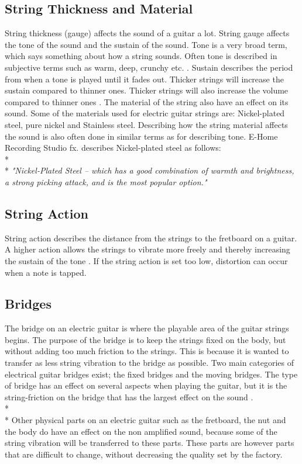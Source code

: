 \subsection{String Thickness and Material}
String thickness (gauge) affects the sound of a guitar a lot. String gauge affects the tone of the sound and the sustain of the sound. Tone is a very broad term, which says something about how a string sounds. Often tone is described in subjective terms such as warm, deep, crunchy etc. \cite{premierguitar}. Sustain describes the period from when a tone is played until it fades out. Thicker strings will increase the sustain compared to thinner ones. Thicker strings will also increase the volume compared to thinner ones \cite{Helsinki}.
The material of the string also have an effect on its sound. Some of the materials used for electric guitar strings are: Nickel-plated steel, pure nickel and Stainless steel. Describing how the string material affects the sound is also often done in similar terms as for describing tone. E-Home Recording Studio fx. describes Nickel-plated steel as follows:
\\*
\\*
\textit{"Nickel-Plated Steel – which has a good combination of warmth and brightness, a strong picking attack, and is the most popular option."}\cite{E-Home}

\subsection{String Action}
String action describes the distance from the strings to the fretboard on a guitar. A higher action allows the strings to vibrate more freely and thereby increasing the sustain of the tone \cite{sweetwater}. If the string action is set too low, distortion can occur when a note is tapped.  

\subsection{Bridges}
The bridge on an electric guitar is where the playable area of the guitar strings begins. The purpose of the bridge is to keep the strings fixed on the body, but without adding too much friction to the strings. This is because it is wanted to transfer as less string vibration to the bridge as possible. Two main categories of electrical guitar bridges exist; the fixed bridges and the moving bridges. The type of bridge has an effect on several aspects when playing the guitar, but it is the string-friction on the bridge that has the largest effect on the sound \cite{seymourduncan}.
\\*
\\*
Other physical parts on an electric guitar such as the fretboard, the nut and the body do have an effect on the non amplified sound, because some of the string vibration will be transferred to these parts. These parts are however parts that are difficult to change, without decreasing the quality set by the factory.   




